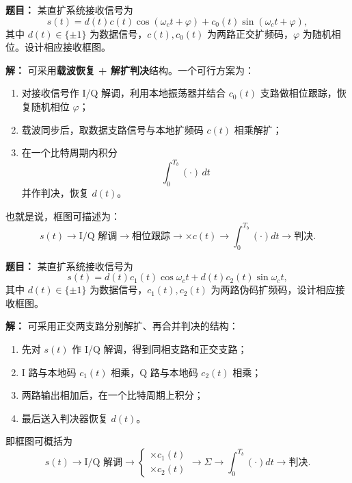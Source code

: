 \medskip
{}
\textbf{题目：}
某直扩系统接收信号为
\[
s(t)=d(t)c(t)\cos(\omega_ct+\varphi)+c_0(t)\sin(\omega_ct+\varphi),
\]
其中 $d(t)\in\{\pm 1\}$ 为数据信号，$c(t),c_0(t)$ 为两路正交扩频码，$\varphi$ 为随机相位。设计相应接收框图。

\par\textbf{解：}
可采用\textbf{载波恢复 + 解扩判决}结构。一个可行方案为：
\begin{enumerate}
\item 对接收信号作 I/Q 解调，利用本地振荡器并结合 $c_0(t)$ 支路做相位跟踪，恢复随机相位 $\varphi$；
\item 载波同步后，取数据支路信号与本地扩频码 $c(t)$ 相乘解扩；
\item 在一个比特周期内积分
\[
\int_0^{T_b}(\cdot)\,dt
\]
并作判决，恢复 $d(t)$。
\end{enumerate}
也就是说，框图可描述为：
\[
s(t)\rightarrow \text{I/Q 解调}\rightarrow \text{相位跟踪}\rightarrow \times c(t)\rightarrow \int_0^{T_b}(\cdot)dt\rightarrow \text{判决}.
\]

\medskip
{}
\textbf{题目：}
某直扩系统接收信号为
\[
s(t)=d(t)c_1(t)\cos\omega_ct+d(t)c_2(t)\sin\omega_ct,
\]
其中 $d(t)\in\{\pm 1\}$ 为数据信号，$c_1(t),c_2(t)$ 为两路伪码扩频码，设计相应接收框图。

\par\textbf{解：}
可采用正交两支路分别解扩、再合并判决的结构：
\begin{enumerate}
\item 先对 $s(t)$ 作 I/Q 解调，得到同相支路和正交支路；
\item I 路与本地码 $c_1(t)$ 相乘，Q 路与本地码 $c_2(t)$ 相乘；
\item 两路输出相加后，在一个比特周期上积分；
\item 最后送入判决器恢复 $d(t)$。
\end{enumerate}
即框图可概括为
\[
s(t)\rightarrow \text{I/Q 解调}\rightarrow
\begin{cases}
\times c_1(t)\\
\times c_2(t)
\end{cases}
\rightarrow \Sigma \rightarrow \int_0^{T_b}(\cdot)dt\rightarrow \text{判决}.
\]

\medskip
